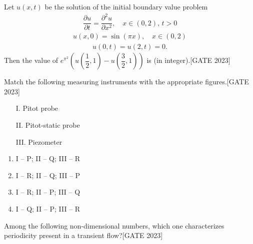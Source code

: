     \item Let $u(x, t)$ be the solution of the initial boundary value problem
    \begin{align*}
    \dfrac{\partial u}{\partial t} = \dfrac{\partial^2 u}{\partial x^2}, \quad x \in (0, 2), \, t > 0
    \end{align*}
    \begin{align*}
    u(x, 0) = \sin(\pi x), \quad x \in (0, 2)
    \end{align*}
    \begin{align*}
    u(0, t) = u(2, t) = 0.
    \end{align*}
    Then the value of $e^{\pi^2} \left( u\left( \dfrac{1}{2}, 1 \right) - u\left( \dfrac{3}{2}, 1 \right) \right)$ is \underline{\hspace{1cm}} (in integer).\hfill{[GATE 2023]}
     \item Match the following measuring instruments with the appropriate figures.\hfill{[GATE 2023]}
    \begin{enumerate}
    \item[I.] Pitot probe
        \item[II.] Pitot-static probe
        \item[III.] Piezometer
    \end{enumerate}
    


    \begin{multicols}{2}
    \begin{enumerate}
        \item I -- P; II -- Q; III -- R
        \item I -- R; II -- Q; III -- P
        \item I -- R; II -- P; III -- Q
        \item I -- Q; II -- P; III -- R
    \end{enumerate}
    \end{multicols}

    \item Among the following non-dimensional numbers, which one characterizes periodicity present in a transient flow?\hfill{[GATE 2023]}
    
    


